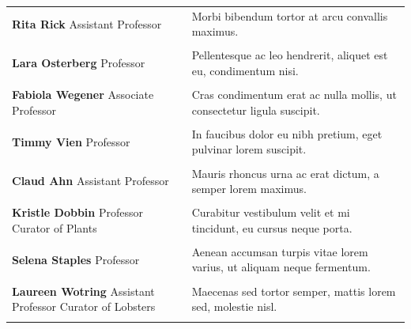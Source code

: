 \documentclass{book} %
\begin{document}
\begin{table}[ht!]
\begin{tabular}{p{2.5in} p{4.5in}}
\textbf{Rita Rick} \newline Assistant Professor & Morbi bibendum tortor at arcu convallis maximus. \\ \\
\textbf{Lara Osterberg} \newline Professor & Pellentesque ac leo hendrerit, aliquet est eu, condimentum nisi.\\ \\
\textbf{Fabiola Wegener} \newline Associate Professor & Cras condimentum erat ac nulla mollis, ut consectetur ligula suscipit. \\ \\
\textbf{Timmy Vien} \newline Professor & In faucibus dolor eu nibh pretium, eget pulvinar lorem suscipit.\\ \\
\textbf{Claud Ahn} \newline Assistant Professor & Mauris rhoncus urna ac erat dictum, a semper lorem maximus.\\ \\
\textbf{Kristle Dobbin} \newline Professor \newline Curator of Plants & Curabitur vestibulum velit et mi tincidunt, eu cursus neque porta.\\ \\
\textbf{Selena Staples} \newline Professor & Aenean accumsan turpis vitae lorem varius, ut aliquam neque fermentum.\\ \\
\textbf{Laureen Wotring} \newline Assistant Professor \newline Curator of Lobsters & Maecenas sed tortor semper, mattis lorem sed, molestie nisl.\\ \\

\end{tabular}
\end{table}

\clearpage %
\end{document}

